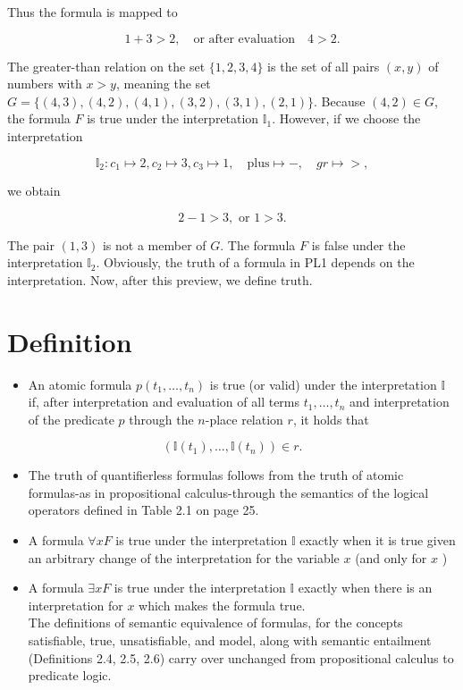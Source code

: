 \documentclass[10pt]{book}
\begin{document}
Thus the formula is mapped to

$$
1+3>2, \quad \text{or after evaluation} \quad 4>2 .
$$

The greater-than relation on the set $\{1,2,3,4\}$ is the set of all pairs $(x, y)$ of numbers with $x>y$, meaning the set $G=\{(4,3),(4,2),(4,1),(3,2),(3,1),(2,1)\}$. Because $(4,2) \in G$, the formula $F$ is true under the interpretation $\mathbb{I}_{1}$. However, if we choose the interpretation

$$
\mathbb{I}_{2}: c_{1} \mapsto 2, c_{2} \mapsto 3, c_{3} \mapsto 1, \quad \text{plus} \mapsto -, \quad gr \mapsto >,
$$

we obtain

$$
2-1>3, \text{ or } 1>3 .
$$

The pair $(1,3)$ is not a member of $G$. The formula $F$ is false under the interpretation $\mathbb{I}_{2}$. Obviously, the truth of a formula in PL1 depends on the interpretation. Now, after this preview, we define truth.

\section{Definition}
\begin{itemize}
  \item An atomic formula $p\left(t_{1}, \ldots, t_{n}\right)$ is true (or valid) under the interpretation $\mathbb{I}$ if, after interpretation and evaluation of all terms $t_{1}, \ldots, t_{n}$ and interpretation of the predicate $p$ through the $n$-place relation $r$, it holds that
\end{itemize}
$$
\left(\mathbb{I}\left(t_{1}\right), \ldots, \mathbb{I}\left(t_{n}\right)\right) \in r .
$$

\begin{itemize}
  \item The truth of quantifierless formulas follows from the truth of atomic formulas-as in propositional calculus-through the semantics of the logical operators defined in Table 2.1 on page 25.
  \item A formula $\forall x F$ is true under the interpretation $\mathbb{I}$ exactly when it is true given an arbitrary change of the interpretation for the variable $x$ (and only for $x$ )
  \item A formula $\exists x F$ is true under the interpretation $\mathbb{I}$ exactly when there is an interpretation for $x$ which makes the formula true.\\
The definitions of semantic equivalence of formulas, for the concepts satisfiable, true, unsatisfiable, and model, along with semantic entailment (Definitions 2.4, 2.5, 2.6) carry over unchanged from propositional calculus to predicate logic.
\end{itemize}
\end{document}
